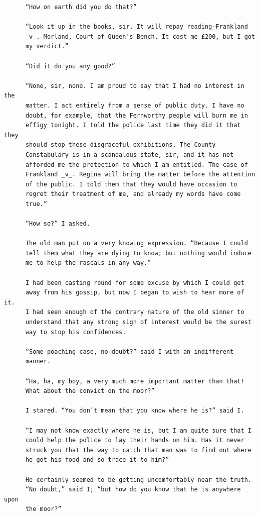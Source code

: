 \documentclass{article}
\begin{document}
\begin{verbatim}
      “How on earth did you do that?”

      “Look it up in the books, sir. It will repay reading—Frankland
      _v_. Morland, Court of Queen’s Bench. It cost me £200, but I got
      my verdict.”

      “Did it do you any good?”

      “None, sir, none. I am proud to say that I had no interest in the
      matter. I act entirely from a sense of public duty. I have no
      doubt, for example, that the Fernworthy people will burn me in
      effigy tonight. I told the police last time they did it that they
      should stop these disgraceful exhibitions. The County
      Constabulary is in a scandalous state, sir, and it has not
      afforded me the protection to which I am entitled. The case of
      Frankland _v_. Regina will bring the matter before the attention
      of the public. I told them that they would have occasion to
      regret their treatment of me, and already my words have come
      true.”

      “How so?” I asked.

      The old man put on a very knowing expression. “Because I could
      tell them what they are dying to know; but nothing would induce
      me to help the rascals in any way.”

      I had been casting round for some excuse by which I could get
      away from his gossip, but now I began to wish to hear more of it.
      I had seen enough of the contrary nature of the old sinner to
      understand that any strong sign of interest would be the surest
      way to stop his confidences.

      “Some poaching case, no doubt?” said I with an indifferent
      manner.

      “Ha, ha, my boy, a very much more important matter than that!
      What about the convict on the moor?”

      I stared. “You don’t mean that you know where he is?” said I.

      “I may not know exactly where he is, but I am quite sure that I
      could help the police to lay their hands on him. Has it never
      struck you that the way to catch that man was to find out where
      he got his food and so trace it to him?”

      He certainly seemed to be getting uncomfortably near the truth.
      “No doubt,” said I; “but how do you know that he is anywhere upon
      the moor?”


\end{verbatim}
\end{document}
